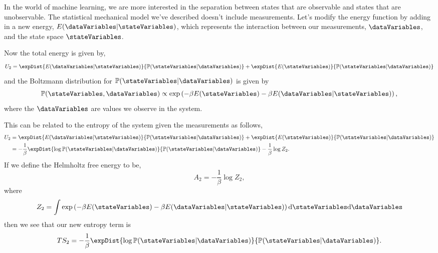In the world of machine learning, we are more interested in the
separation between states that are observable and states that are
unobservable. The statistical mechanical model we've described doesn't
include measurements. Let's modify the energy function by adding in a
new energy, \(E(\dataVariables | \stateVariables)\), which represents
the interaction between our measurements, \(\dataVariables\), and the
state space \(\stateVariables\).

Now the total energy is given by, 
\[
U_2 = \expDist{E(\dataVariables | \stateVariables)}{\mathbb{P}(\stateVariables| \dataVariables)} + \expDist{E(\stateVariables)}{\mathbb{P}(\stateVariables| \dataVariables)}
\] 
and the Boltzmann distribution for
\(\mathbb{P}(\stateVariables | \dataVariables)\) is given by 
\[
\mathbb{P}(\stateVariables,  \dataVariables) \propto \exp \left(-\beta E(\stateVariables) -\beta E(\dataVariables | \stateVariables)\right),
\] 
where the \(\dataVariables\) are values we observe in the system.

This can be related to the entropy of the system given the measurements
as follows, 
\begin{align*}
U_2 & = \expDist{E(\dataVariables |  \stateVariables)}{\mathbb{P}(\stateVariables |  \dataVariables)} + \expDist{E(\stateVariables)}{\mathbb{P}(\stateVariables | \dataVariables)} \\
& = -\frac{1}{\beta} \expDist{\log \mathbb{P}(\stateVariables | \dataVariables)}{\mathbb{P}(\stateVariables | \dataVariables)} - \frac{1}{\beta}\log Z_2.
\end{align*}
If we define the Helmholtz free energy to be, 
\[
A_2 = -\frac{1}{\beta} \log  Z_2,
\] 
where 
\[
Z_2 = \int \exp \left(-\beta E(\stateVariables) -\beta E(\dataVariables | \stateVariables)\right) \text{d}\stateVariables \text{d}\dataVariables
\] 
then we see that our new entropy term is 
\[
TS_2 = -\frac{1}{\beta} \expDist{\log \mathbb{P}(\stateVariables | \dataVariables)}{\mathbb{P}(\stateVariables | \dataVariables)}.
\]


